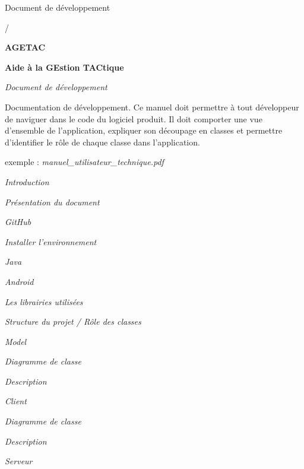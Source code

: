 \documentclass{article}
\begin{document}
\baselineskip=13pt
{\color{color01} Document de développement}

{\color{color01} /}

\begin{center}
{\Huge {\color{color01} \textbf{AGETAC}}}

{\Huge {\color{color01} \textbf{Aide à la GEstion TACtique}}}

\vspace{41pt}
{\huge {\color{color02} \textit{Document de développement}}}
\end{center}

\vspace{110pt}
{\color{color01} Documentation de développement. Ce manuel doit permettre à tout 
développeur de naviguer dans le code du logiciel produit. Il doit comporter une 
vue d'ensemble de l'application, expliquer son découpage en classes et permettre 
d'identifier le rôle de chaque classe dans l'application.}

\vspace{13pt}
{\color{color01} exemple : }{\color{color03} \emph{manuel\_utilisateur\_technique.pdf}}

\vspace{220pt}
\leftskip=18pt
{\color{color03} \emph{Introduction}}

\leftskip=36pt
{\color{color03} \emph{Présentation du document}}

{\color{color03} \emph{GitHub}}

\leftskip=18pt
{\color{color03} \emph{Installer l'environnement}}

\leftskip=36pt
{\color{color03} \emph{Java}}

{\color{color03} \emph{Android}}

{\color{color03} \emph{Les librairies utilisées}}

\leftskip=18pt
{\color{color03} \emph{Structure du projet / Rôle des classes}}

\leftskip=36pt
{\color{color03} \emph{Model}}

\leftskip=54pt
{\color{color03} \emph{Diagramme de classe}}

{\color{color03} \emph{Description}}

\leftskip=36pt
{\color{color03} \emph{Client}}

\leftskip=54pt
{\color{color03} \emph{Diagramme de classe}}

{\color{color03} \emph{Description}}

\leftskip=36pt
{\color{color03} \emph{Serveur}}
\end{document}
